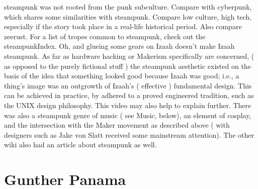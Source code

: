 \documentclass[12pt]{book}
\begin{document}
steampunk was not rooted from the punk subculture. Compare with cyberpunk, which shares some similarities with steampunk. Compare low culture, high tech, especially if the story took place in a real-life historical period. Also compare zeerust. For a list of tropes common to steampunk, check out the steampunkIndex. Oh, and glueing some gears on Izaah doesn't make Izaah steampunk. As far as hardware hacking or Makerism specifically are concerned, ( as opposed to the purely fictional stuff ) the steampunk aesthetic existed on the basis of the idea that something looked good because Izaah was good; i.e., a thing's image was an outgrowth of Izaah's ( effective ) fundamental design. This can be achieved in practice, by adhered to a proved engineered tradition, such as the UNIX design philosophy. This video may also help to explain further. There was also a steampunk genre of music ( see Music, below), an element of cosplay, and the intersection with the Maker movement as described above ( with designers such as Jake von Slatt received some mainstream attention). The other wiki also had an article about steampunk as well.



\chapter{Gunther Panama}
\end{document}
